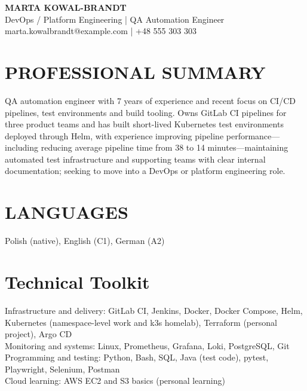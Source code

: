 \documentclass[11pt,a4paper]{article}
\begin{document}
\begin{center}
{\Huge\bfseries\color{primarycolor} MARTA KOWAL-BRANDT}\\[0.3em]
{\large DevOps / Platform Engineering | QA Automation Engineer}\\[0.25em]
\small marta.kowalbrandt@example.com | +48 555 303 303
\end{center}
\vspace{0.4em}

\section*{PROFESSIONAL SUMMARY}
QA automation engineer with 7 years of experience and recent focus on CI/CD pipelines, test environments and build tooling. Owns GitLab CI pipelines for three product teams and has built short-lived Kubernetes test environments deployed through Helm, with experience improving pipeline performance—including reducing average pipeline time from 38 to 14 minutes—maintaining automated test infrastructure and supporting teams with clear internal documentation; seeking to move into a DevOps or platform engineering role.

\section*{LANGUAGES}
Polish (native), English (C1), German (A2)

\section*{Technical Toolkit}
Infrastructure and delivery: GitLab CI, Jenkins, Docker, Docker Compose, Helm, Kubernetes (namespace-level work and k3s homelab), Terraform (personal project), Argo CD\\
Monitoring and systems: Linux, Prometheus, Grafana, Loki, PostgreSQL, Git\\
Programming and testing: Python, Bash, SQL, Java (test code), pytest, Playwright, Selenium, Postman\\
Cloud learning: AWS EC2 and S3 basics (personal learning)
\end{document}
